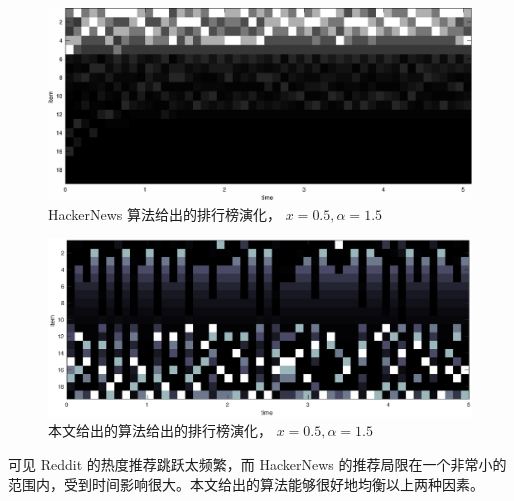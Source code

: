\documentclass[UTF8]{ctexart}
\theoremstyle{plain}
\theoremstyle{definition}
\theoremstyle{remark}
\begin{document}
	\begin{figure}[h!]
		\centering
		\includegraphics[width = \linewidth]{../model/douhu/pic/hackerNews-heatmap.eps}
		\caption{HackerNews 算法给出的排行榜演化， $x=0.5, \alpha=1.5$}\label{fig:hackerNews-heatmap}
	\end{figure}
	
	\begin{figure}[h!]
		\centering
		\includegraphics[width = \linewidth]{../model/douhu/pic/ours-heatmap.eps}
		\caption{本文给出的算法给出的排行榜演化， $x=0.5, \alpha=1.5$}\label{fig:ours-heatmap}
	\end{figure}
	可见 Reddit 的热度推荐跳跃太频繁，而 HackerNews 的推荐局限在一个非常小的范围内，受到时间影响很大。本文给出的算法能够很好地均衡以上两种因素。
	
\end{document}
